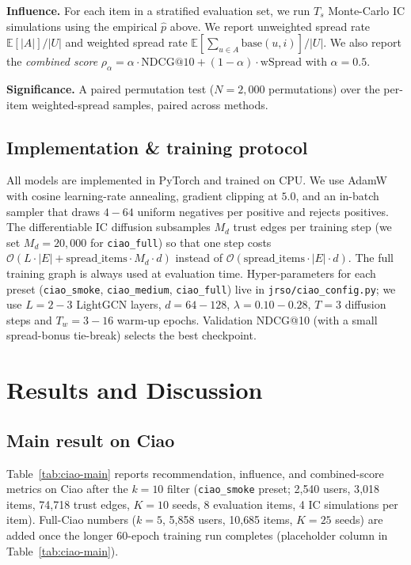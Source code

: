 \documentclass[conference]{IEEEtran}
\begin{document}
\textbf{Influence.} For each item in a stratified evaluation set, we
run $T_s$ Monte-Carlo IC simulations using the empirical $\hat p$
above. We report unweighted spread rate
$\mathbb{E}[|A|]/|U|$ and weighted spread rate
$\mathbb{E}[\sum_{u\in A}\mathrm{base}(u,i)]/|U|$. We also report the
\emph{combined score}
$\rho_\alpha=\alpha\cdot\mathrm{NDCG@10}+(1-\alpha)\cdot\mathrm{wSpread}$
with $\alpha\!=\!0.5$.

\textbf{Significance.} A paired permutation test
($N\!=\!2{,}000$ permutations) over the per-item weighted-spread
samples, paired across methods.

\subsection{Implementation \& training protocol}
All models are implemented in PyTorch and trained on CPU. We use AdamW
with cosine learning-rate annealing, gradient clipping at $5.0$, and an
in-batch sampler that draws $4\!-\!64$ uniform negatives per positive
and rejects positives. The differentiable IC diffusion subsamples
$M_d$ trust edges per training step (we set $M_d=20{,}000$ for
\texttt{ciao\_full}) so that one step costs
$\mathcal{O}(L\cdot|E|+\mathrm{spread\_items}\cdot M_d\cdot d)$ instead
of $\mathcal{O}(\mathrm{spread\_items}\cdot|E|\cdot d)$. The full
training graph is always used at evaluation time. Hyper-parameters for
each preset (\texttt{ciao\_smoke}, \texttt{ciao\_medium},
\texttt{ciao\_full}) live in \texttt{jrso/ciao\_config.py}; we use
$L\!=\!2\!-\!3$ LightGCN layers, $d\!=\!64\!-\!128$, $\lambda\!=\!0.10\!-\!0.28$,
$T\!=\!3$ diffusion steps and $T_w\!=\!3\!-\!16$ warm-up epochs.
Validation NDCG@10 (with a small spread-bonus tie-break) selects the
best checkpoint.

\section{Results and Discussion}

\subsection{Main result on Ciao}

Table~\ref{tab:ciao-main} reports recommendation, influence, and
combined-score metrics on Ciao after the $k\!=\!10$ filter
(\texttt{ciao\_smoke} preset; 2{,}540 users, 3{,}018 items, 74{,}718
trust edges, $K\!=\!10$ seeds, 8 evaluation items, 4 IC simulations
per item). Full-Ciao numbers ($k\!=\!5$, 5{,}858 users, 10{,}685 items,
$K\!=\!25$ seeds) are added once the longer 60-epoch training run
completes (placeholder column in Table~\ref{tab:ciao-main}).
\end{document}

